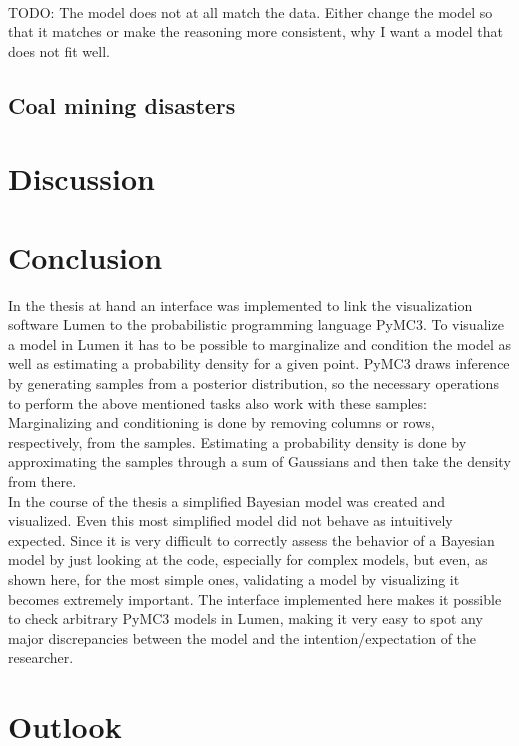 \documentclass{article}
\begin{document}
\\
TODO: The model does not at all match the data. Either change the model so that it matches or make the reasoning more consistent, why I want a model that does not fit well.
\subsection{Coal mining disasters}

\section{Discussion}

\section {Conclusion}
In the thesis at hand an interface was implemented to link the visualization software Lumen to the probabilistic programming language PyMC3. To visualize a model in Lumen it has to be possible to marginalize and condition the model as well as estimating a probability density for a given point. PyMC3 draws inference by generating samples from a posterior distribution, so the necessary operations to perform the above mentioned tasks also work with these samples: Marginalizing and conditioning is done by removing columns or rows, respectively, from the samples. Estimating a probability density is done by approximating the samples through a sum of Gaussians and then take the density from there.\\
In the course of the thesis a simplified Bayesian model was created and visualized. Even this most simplified model did not behave as intuitively expected. Since it is very difficult to correctly assess the behavior of a Bayesian model by just looking at the code, especially for complex models, but even, as shown here, for the most simple ones, validating a model by visualizing it becomes extremely important. The interface implemented here makes it possible to check arbitrary PyMC3 models in Lumen, making it very easy to spot any major discrepancies between the model and the intention/expectation of the researcher.

\section{Outlook}

\listoffigures
        


\end{document}

